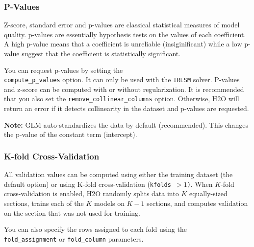 \waterExampleInR



\subsubsection{P-Values}
Z-score, standard error and p-values are classical statistical measures of model quality. p-values are essentially
hypothesis tests on the values of each coefficient. A high p-value means that a coefficient is unreliable
(insiginificant) while a low p-value suggest that the coefficient is statistically significant.

You can request p-values by setting the \\\texttt{compute\_p\_values} option. It can only be used with the
\texttt{IRLSM} solver. P-values and z-score can be computed with or without regularization. It is recommended that you also set the \texttt{remove\_collinear\_columns} option. Otherwise, H2O will return an error if it detects collinearity in the dataset and p-values are requested. 

\textbf{Note:} GLM auto-standardizes the data by default (recommended). This changes the p-value of the constant term
(intercept).

\waterExampleInR



\subsubsection{K-fold Cross-Validation}

All validation values can be computed using either the training dataset (the default option) or using K-fold
cross-validation (\texttt{kfolds $> 1$)}. When $K$-fold cross-validation is enabled, H2O randomly splits data into $K$
equally-sized sections, trains each of the $K$ models on $K-1$ sections, and computes validation on the section that was not
used for training.

You can also specify the rows assigned to each fold using the\\ \texttt{fold\_assignment}
or \texttt{fold\_column} parameters.

\waterExampleInR


\waterExampleInPython


